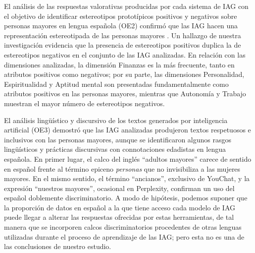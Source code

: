 \documentclass[spanish]{textolivre}
\begin{document}
El análisis de las respuestas valorativas producidas por cada sistema de IAG con el objetivo de identificar estereotipos prototípicos positivos y negativos sobre personas mayores en lengua española (OE2) confirmó que las IAG hacen una representación estereotipada de las personas mayores \cite{stypinska2023}. Un hallazgo de nuestra investigación evidencia que la presencia de estereotipos positivos duplica la de estereotipos negativos en el conjunto de las IAG analizadas. En relación con las dimensiones analizadas, la dimensión Finanzas es la más frecuente, tanto en atributos positivos como negativos; por su parte, las dimensiones Personalidad, Espiritualidad y Aptitud mental son presentadas fundamentalmente como atributos positivos en las personas mayores, mientras que Autonomía y Trabajo muestran el mayor número de estereotipos negativos.

El análisis lingüístico y discursivo de los textos generados por inteligencia artificial (OE3) demostró que las IAG analizadas produjeron textos respetuosos e inclusivos con las personas mayores, aunque se identificaron algunos rasgos lingüísticos y prácticas discursivas con connotaciones edadistas en lengua española. En primer lugar, el calco del inglés ``adultos mayores'' carece de sentido en español frente al término epiceno \textit{personas} que no invisibiliza a las mujeres mayores. En el mismo sentido, el término ``ancianos'', exclusivo de YouChat, y la expresión ``nuestros mayores'', ocasional en Perplexity, confirman un uso del español doblemente discriminatorio. A modo de hipótesis, podemos suponer que la proporción de datos en español a la que tiene acceso cada modelo de IAG puede llegar a alterar las respuestas ofrecidas por estas herramientas, de tal manera que se incorporen calcos discriminatorios procedentes de otras lenguas utilizadas durante el proceso de aprendizaje de las IAG; pero esta no es una de las conclusiones de nuestro estudio.
\end{document}
